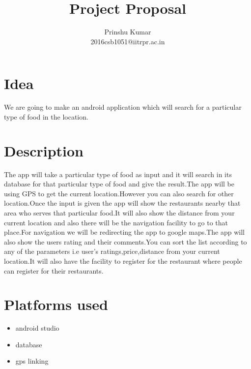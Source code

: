 \documentclass[journal]{IEEEtran}
\begin{document}
\title{Project Proposal}

\author{

Prinshu Kumar\\
2016csb1051@iitrpr.ac.in

}


\maketitle


\section{Idea}
We are going to make an android application which will search for a particular type of food in the location. 
\section{Description}
The app will take a particular type of food as input and it will search in its database for that particular type of food and give the result.The app will be using GPS to get the current location.However you can also search for other location.Once the input is given the app will show the restaurants nearby that area who serves that particular food.It will also show the distance from your current location and also there will be the navigation facility to go to that place.For navigation we will be redirecting the app to google maps.The app will also show the users rating and their comments.You can sort the list according to any of the parameters i.e user's ratings,price,distance from your current location.It will also have the facility to register for the restaurant where people can register for their restaurants.
\section{Platforms used}
\begin{itemize}
    \item android studio
    \item database
    \item gps linking
\end{itemize}
 
\end{document}
